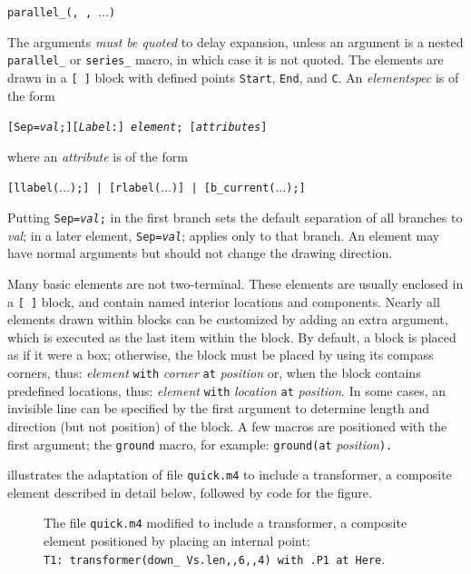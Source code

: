 {\tt parallel\_({\RQ, \RQ,}
 $\ldots$)}

The arguments {\em must be quoted} to delay expansion, unless an argument
is a nested {\tt parallel\_} or {\tt series\_} macro,
in which case it is not quoted.
The elements are drawn in a {\tt [ ]} block with defined points
{\tt Start}, {\tt End}, and {\tt C}.
An {\sl elementspec} is of the form

{\tt [Sep={\sl val};][{\sl Label}:] {\sl element}; [{\sl attributes}]}

\noindent
where an {\sl attribute} is of the form

{\tt [llabel($\ldots$);] | [rlabel($\ldots$)] | [b\_current($\ldots$);]}

Putting {\tt Sep={\sl val};} in the first branch sets the default
separation of all branches to {\sl val}; in a later
element, {\tt Sep={\sl val}}; applies only to that branch.  
An element may have normal arguments but should
not change the drawing direction. 

Many basic elements are not two-terminal. These elements are usually enclosed in
a \verb|[ ]| \pic block, and contain named interior locations and components.
Nearly all elements drawn within blocks can be customized by adding an
extra argument, which is executed as the last item within the block.
By default, a block is placed as if it were a box; otherwise,
the block must be placed by using its compass corners, thus:
  {\sl element} {\tt with} {\sl corner} {\tt at} {\sl position} 
or, when the block contains predefined locations, thus:
  {\sl element} {\tt with} {\sl location} {\tt at} {\sl position}.
In some cases, an invisible line can be specified by the first argument
to determine length and direction (but not position) of the block.
A few macros are positioned with the first argument;
the {\tt ground} macro, for example:
  {\tt ground(}{\tt at} {\sl position}{\tt ).} 

\enlargethispage{\baselineskip}
 illustrates the adaptation of file {\tt quick.m4} to
include a transformer, a composite element described in detail below,
followed by code for the figure.
\begin{figure}[H]
   
   \caption{The file {\tt quick.m4} modified to include a
    transformer, a composite element positioned by placing an
     internal point:
     {\tt T1:~transformer(down\_ Vs.len,{},6,{},4) with .P1 at Here}.}
   \label{QTrans}
   \end{figure}


